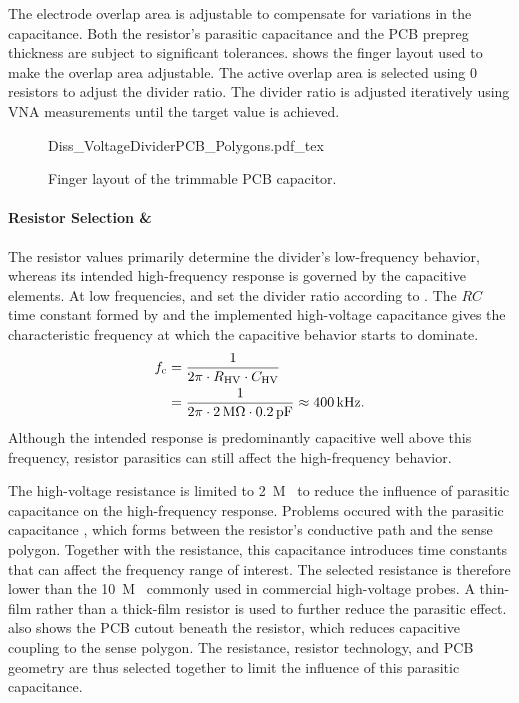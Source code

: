 The electrode overlap area is adjustable to compensate for variations in the capacitance.
Both the resistor's parasitic capacitance and the PCB prepreg thickness are subject to significant tolerances.
 shows the finger layout used to make the overlap area adjustable.
The active overlap area is selected using \SI{0}{\Omega} resistors to adjust the divider ratio.
The divider ratio is adjusted iteratively using VNA measurements until the target value is achieved.

\begin{figure}[ht]
	\centering
	{Diss_VoltageDividerPCB_Polygons.pdf_tex}
	\caption{Finger layout of the trimmable PCB capacitor.}\label{fig:VoltageDividerPCB_Polygon}
\end{figure}


\paragraph*{Resistor Selection {\boldmath{} \& }}
The resistor values primarily determine the divider's low-frequency behavior, whereas its intended high-frequency response is governed by the capacitive elements.
At low frequencies,  and  set the divider ratio according to .
The $RC$ time constant formed by  and the implemented high-voltage capacitance  gives the characteristic frequency at which the capacitive behavior starts to dominate.
\begin{align}	
	{f}_{\mathrm{c}} &= \frac{1}{2\pi \cdot {R}_{\mathrm{HV}} \cdot {C}_{\mathrm{HV}}} \\
				&= \frac{1}{2\pi \cdot \SI{2}{M\Omega} \cdot \SI{0.2}{pF}} \approx \SI{400}{kHz}.
\end{align}
Although the intended response is predominantly capacitive well above this frequency, resistor parasitics can still affect the high-frequency behavior.

The high-voltage resistance is limited to \SI{2}{M\Omega} to reduce the influence of parasitic capacitance on the high-frequency response.
Problems occured with the parasitic capacitance , which forms between the resistor's conductive path and the sense polygon.
Together with the resistance, this capacitance introduces time constants that can affect the frequency range of interest.
The selected resistance is therefore lower than the \SI{10}{M\Omega} commonly used in commercial high-voltage probes.
A thin-film rather than a thick-film resistor is used to further reduce the parasitic effect.
 also shows the PCB cutout beneath the resistor, which reduces capacitive coupling to the sense polygon.
The resistance, resistor technology, and PCB geometry are thus selected together to limit the influence of this parasitic capacitance.

